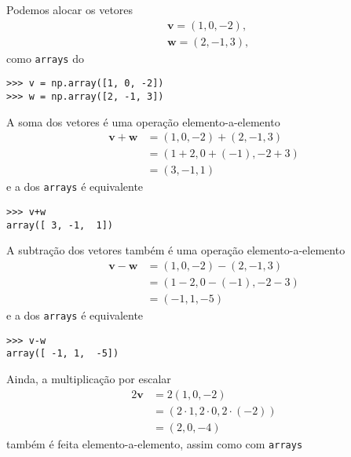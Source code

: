 \begin{ex}
  Podemos alocar os vetores
  \begin{align}
    &\pmb{v} = (1, 0, -2),\\
    &\pmb{w} = (2, -1, 3),
  \end{align}
  como \texttt{arrays} do {\numpy}

\begin{lstlisting}
>>> v = np.array([1, 0, -2])
>>> w = np.array([2, -1, 3])
\end{lstlisting}

  A soma dos vetores é uma operação elemento-a-elemento
  \begin{subequations}
    \begin{align}
      \pmb{v}+\pmb{w} &= (1, 0, -2) + (2, -1, 3)\\
                      &= \left(1+2, 0+(-1), -2+3\right)\\
                      &= (3, -1, 1)
    \end{align}
  \end{subequations}
  e a dos \texttt{arrays} é equivalente

\begin{lstlisting}
>>> v+w
array([ 3, -1,  1])
\end{lstlisting}

  A subtração dos vetores também é uma operação elemento-a-elemento
  \begin{subequations}
    \begin{align}
      \pmb{v}-\pmb{w} &= (1, 0, -2) - (2, -1, 3)\\
                      &= \left(1-2, 0-(-1), -2-3\right)\\
                      &= (-1, 1, -5)
    \end{align}
  \end{subequations}
  e a dos \texttt{arrays} é equivalente

\begin{lstlisting}
>>> v-w
array([ -1, 1,  -5])
\end{lstlisting}

  Ainda, a multiplicação por escalar
  \begin{subequations}
    \begin{align}
      2\pmb{v} &= 2(1, 0, -2)\\
               &= \left(2\cdot 1, 2\cdot 0, 2\cdot(-2)\right)\\
               &= (2, 0, -4)
    \end{align}
  \end{subequations}
  também é feita elemento-a-elemento, assim como com \texttt{arrays}


\end{ex}
